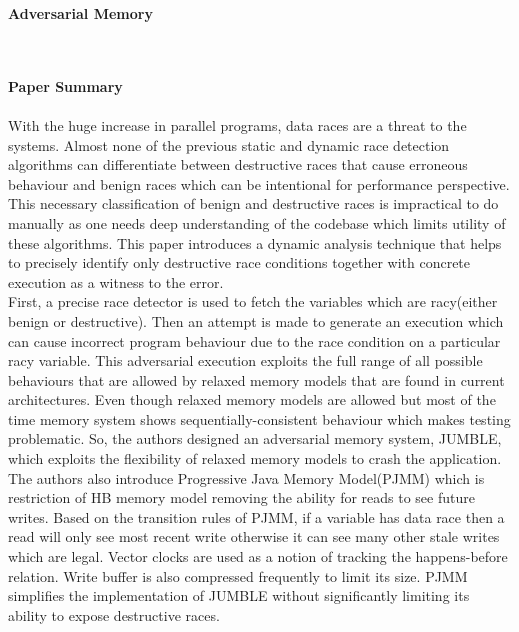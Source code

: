 \documentclass[20pt]{letter}
\begin{document}
\begin{enumerate}
{ \Large
\item
\begin{center}
    \textbf{Adversarial Memory}
\end{center}
}
{ \fontsize{13}{17}\selectfont\\

\textbf{\\Paper Summary}\\\\
With the huge increase in parallel programs, data races are a threat to the systems. Almost none of the previous static and dynamic race detection algorithms can differentiate between destructive races that cause erroneous behaviour and benign races which can be intentional for performance perspective. This necessary classification of benign and destructive races is impractical to do manually as one needs deep understanding of the codebase which limits utility of these algorithms. This paper introduces a dynamic analysis technique that helps to precisely identify only destructive race conditions together with concrete execution as a witness to the error.\\

First, a precise race detector is used to fetch the variables which are racy(either benign or destructive). Then an attempt is made to generate an execution which can cause incorrect program behaviour due to the race condition on a particular racy variable. This adversarial execution exploits the full range of all possible behaviours that are allowed by relaxed memory models that are found in current architectures. Even though relaxed memory models are allowed but most of the time memory system shows sequentially-consistent behaviour which makes testing problematic. So, the authors designed an adversarial memory system, JUMBLE, which exploits the flexibility of relaxed memory models to crash the application. The authors also introduce Progressive Java Memory Model(PJMM) which is restriction of HB memory model removing the ability for reads to see future writes. Based on the transition rules of PJMM, if a variable has data race then a read will only see most recent write otherwise it can see many other stale writes which are legal. Vector clocks are used as a notion of tracking the happens-before relation. Write buffer is also compressed frequently to limit its size. PJMM simplifies the implementation of JUMBLE without significantly limiting its ability to expose destructive races.\\

}
\end{enumerate}
\end{document}
